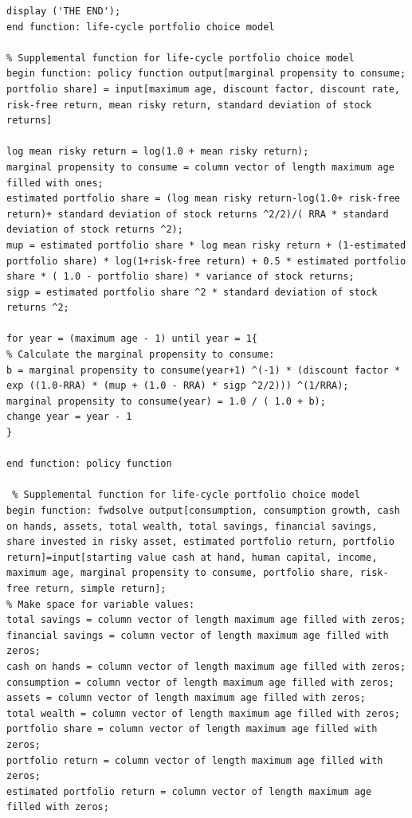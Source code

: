 \documentclass[a4paper,9pt, parskip=half-]{scrartcl}
\begin{document}
\begin{lstlisting}[frame=single]
display ('THE END');
end function: life-cycle portfolio choice model

% Supplemental function for life-cycle portfolio choice model
begin function: policy function output[marginal propensity to consume; portfolio share] = input[maximum age, discount factor, discount rate, risk-free return, mean risky return, standard deviation of stock returns]

log mean risky return = log(1.0 + mean risky return);
marginal propensity to consume = column vector of length maximum age filled with ones;
estimated portfolio share = (log mean risky return-log(1.0+ risk-free return)+ standard deviation of stock returns ^2/2)/( RRA * standard deviation of stock returns ^2);
mup = estimated portfolio share * log mean risky return + (1-estimated portfolio share) * log(1+risk-free return) + 0.5 * estimated portfolio share * ( 1.0 - portfolio share) * variance of stock returns;
sigp = estimated portfolio share ^2 * standard deviation of stock returns ^2;

for year = (maximum age - 1) until year = 1{
% Calculate the marginal propensity to consume:
b = marginal propensity to consume(year+1) ^(-1) * (discount factor * exp ((1.0-RRA) * (mup + (1.0 - RRA) * sigp ^2/2))) ^(1/RRA);
marginal propensity to consume(year) = 1.0 / ( 1.0 + b);
change year = year - 1
}

end function: policy function

 % Supplemental function for life-cycle portfolio choice model
begin function: fwdsolve output[consumption, consumption growth, cash on hands, assets, total wealth, total savings, financial savings, share invested in risky asset, estimated portfolio return, portfolio return]=input[starting value cash at hand, human capital, income, maximum age, marginal propensity to consume, portfolio share, risk-free return, simple return];
% Make space for variable values: 
total savings = column vector of length maximum age filled with zeros;
financial savings = column vector of length maximum age filled with zeros;
cash on hands = column vector of length maximum age filled with zeros;
consumption = column vector of length maximum age filled with zeros;
assets = column vector of length maximum age filled with zeros;
total wealth = column vector of length maximum age filled with zeros;
portfolio share = column vector of length maximum age filled with zeros;
portfolio return = column vector of length maximum age filled with zeros;
estimated portfolio return = column vector of length maximum age filled with zeros;


\end{lstlisting}
\end{document}
